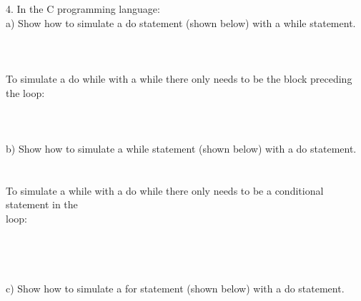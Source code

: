 \documentclass[12pt]{article}
\begin{document}
\begin{flushleft}
4. In the C programming language:\\
[2mm]
\qquad a) Show how to simulate a do statement (shown below) with a while statement.\\
[2mm]

\\
\qquad {}\\
\\
[2mm]

\qquad To simulate a {\selectfont do while} with a {\selectfont while} there only needs to be the block preceding the loop:\\
\qquad {}\\
\qquad {}\\
\qquad \qquad {}\\
[2mm]

\qquad b) Show how to simulate a while statement (shown below) with a do statement.\\
[2mm]

\\
\qquad {}\\
[2mm]

\qquad To simulate a {\selectfont while} with a {\selectfont do while} there only needs to be a conditional statement in the\\
\qquad loop:\\

\qquad {}\\
\qquad \qquad {}\\
\qquad \qquad \qquad {}\\
\qquad {}\\
[2mm]

\qquad c) Show how to simulate a for statement (shown below) with a do statement.\\
[2mm]

\\
\qquad {}\\
[2mm]


\end{flushleft}
\end{document}
